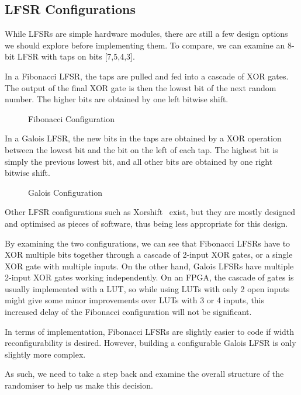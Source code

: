 \subsection{LFSR Configurations}

While LFSRs are simple hardware modules, there are still a few design options we should explore before implementing them.
To compare, we can examine an 8-bit LFSR with taps on bits [7,5,4,3].

In a Fibonacci LFSR, the taps are pulled and fed into a cascade of XOR gates.
The output of the final XOR gate is then the lowest bit of the next random number.
The higher bits are obtained by one left bitwise shift.

\begin{figure}[H]
  \centering
  
  \caption{Fibonacci Configuration}
  \label{FibLFSR}
\end{figure}

In a Galois LFSR, the new bits in the taps are obtained by a XOR operation between the lowest bit and the bit on the left of each tap.
The highest bit is simply the previous lowest bit, and all other bits are obtained by one right bitwise shift.

\begin{figure}[H]
  \centering
  
  \caption{Galois Configuration}
  \label{GalLFSR}
\end{figure}

Other LFSR configurations such as Xorshift~\cite{Marsaglia1} exist, but they are mostly designed and optimised as pieces of software, thus being less appropriate for this design.

By examining the two configurations, we can see that Fibonacci LFSRs have to XOR multiple bits together through a cascade of 2-input XOR gates, or a single XOR gate with multiple inputs.
On the other hand, Galois LFSRs have multiple 2-input XOR gates working independently.
On an FPGA, the cascade of gates is usually implemented with a LUT, so while using LUTs with only 2 open inputs might give some minor improvements over LUTs with 3 or 4 inputs, this increased delay of the Fibonacci configuration will not be significant.

In terms of implementation, Fibonacci LFSRs are slightly easier to code if width reconfigurability is desired.
However, building a configurable Galois LFSR is only slightly more complex.

As such, we need to take a step back and examine the overall structure of the randomiser to help us make this decision.

